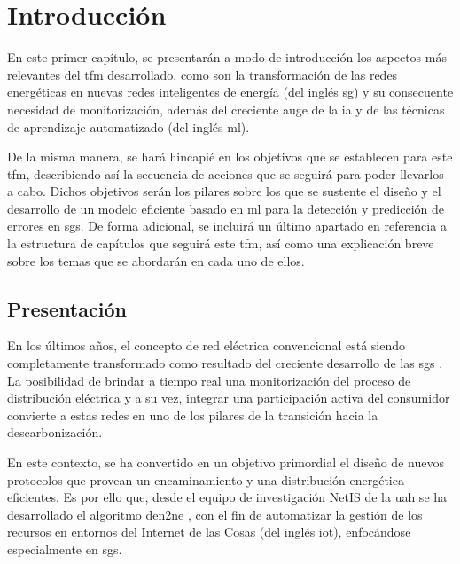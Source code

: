 
\chapter{Introducción}
\label{ch:intro}

En este primer capítulo, se presentarán a modo de introducción los aspectos más relevantes del \gls{tfm} desarrollado, como son la transformación de las redes energéticas en nuevas redes inteligentes de energía (del inglés \gls{sg}) y su consecuente necesidad de monitorización, además del creciente auge de la \gls{ia} y de las técnicas de aprendizaje automatizado (del inglés \gls{ml}).

\vspace{3mm}

De la misma manera, se hará hincapié en los objetivos que se establecen para este \gls{tfm}, describiendo así la secuencia de acciones que se seguirá para poder llevarlos a cabo. Dichos objetivos serán los pilares sobre los que se sustente el diseño y el desarrollo de un modelo eficiente basado en \gls{ml} para la detección y predicción de errores en \gls{sg}s. De forma adicional, se incluirá un último apartado en referencia a la estructura de capítulos que seguirá este \gls{tfm}, así como una explicación breve sobre los temas que se abordarán en cada uno de ellos.


\section{Presentación}
\label{sec:presentacion}

En los últimos años, el concepto de red eléctrica convencional está siendo completamente transformado como resultado del creciente desarrollo de las \gls{sg}s \cite{repsol} \cite{impact}. La posibilidad de brindar a tiempo real una monitorización del proceso de distribución eléctrica y a su vez, integrar una participación activa del consumidor convierte a estas redes en uno de los pilares de la
transición hacia la descarbonización. 

\vspace{3mm}

En este contexto, se ha convertido en un objetivo primordial el diseño de nuevos protocolos que provean un encaminamiento y una distribución energética eficientes. Es por ello que, desde el equipo de investigación NetIS de la \gls{uah} se ha desarrollado el algoritmo \gls{den2ne} \cite{den2ne}, con el fin de automatizar la gestión de los recursos en entornos del Internet de las Cosas (del inglés \gls{iot}), enfocándose especialmente en \gls{sg}s.

